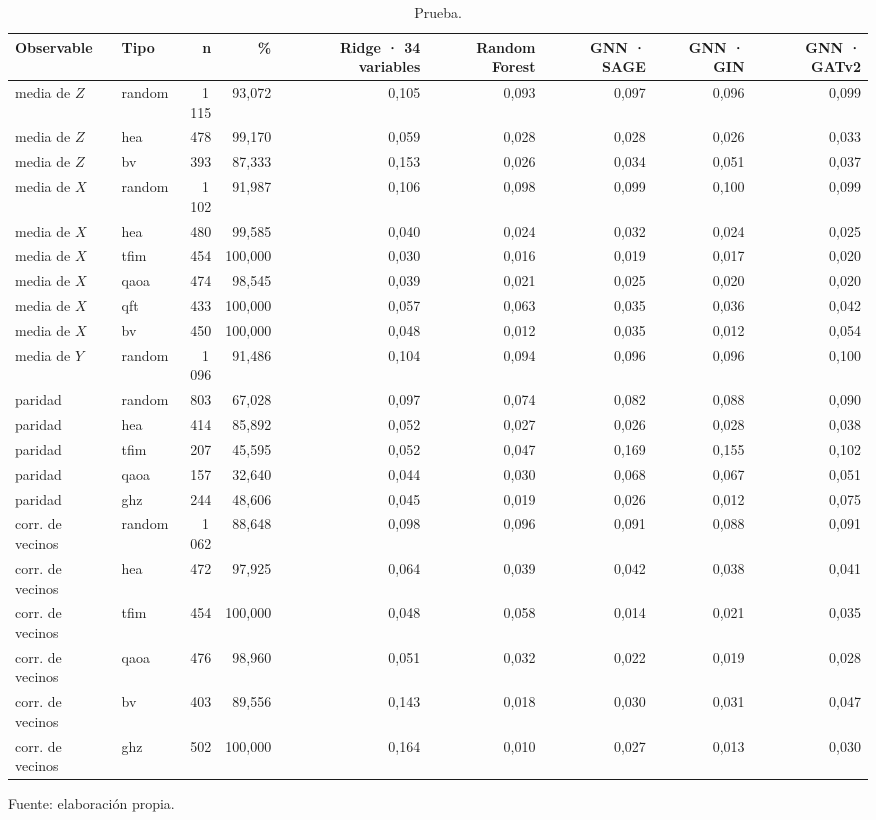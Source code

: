 \begin{table}[htbp]
    \centering
    {\footnotesize
    \begin{tabular}{@{}llrrrrrrr@{}}
        \toprule
        \textbf{Observable} & \textbf{Tipo} & \textbf{n} & \textbf{\%} & \textbf{Ridge · 34 variables} & \textbf{Random Forest} & \textbf{GNN · SAGE} & \textbf{GNN · GIN} & \textbf{GNN · GATv2} \\
        \midrule
        media de $Z$ & random & 1\,115 & 93,072 & 0,105 & 0,093 & 0,097 & 0,096 & 0,099 \\
        media de $Z$ & hea & 478 & 99,170 & 0,059 & 0,028 & 0,028 & 0,026 & 0,033 \\
        media de $Z$ & bv & 393 & 87,333 & 0,153 & 0,026 & 0,034 & 0,051 & 0,037 \\
        media de $X$ & random & 1\,102 & 91,987 & 0,106 & 0,098 & 0,099 & 0,100 & 0,099 \\
        media de $X$ & hea & 480 & 99,585 & 0,040 & 0,024 & 0,032 & 0,024 & 0,025 \\
        media de $X$ & tfim & 454 & 100,000 & 0,030 & 0,016 & 0,019 & 0,017 & 0,020 \\
        media de $X$ & qaoa & 474 & 98,545 & 0,039 & 0,021 & 0,025 & 0,020 & 0,020 \\
        media de $X$ & qft & 433 & 100,000 & 0,057 & 0,063 & 0,035 & 0,036 & 0,042 \\
        media de $X$ & bv & 450 & 100,000 & 0,048 & 0,012 & 0,035 & 0,012 & 0,054 \\
        media de $Y$ & random & 1\,096 & 91,486 & 0,104 & 0,094 & 0,096 & 0,096 & 0,100 \\
        paridad & random & 803 & 67,028 & 0,097 & 0,074 & 0,082 & 0,088 & 0,090 \\
        paridad & hea & 414 & 85,892 & 0,052 & 0,027 & 0,026 & 0,028 & 0,038 \\
        paridad & tfim & 207 & 45,595 & 0,052 & 0,047 & 0,169 & 0,155 & 0,102 \\
        paridad & qaoa & 157 & 32,640 & 0,044 & 0,030 & 0,068 & 0,067 & 0,051 \\
        paridad & ghz & 244 & 48,606 & 0,045 & 0,019 & 0,026 & 0,012 & 0,075 \\
        corr. de vecinos & random & 1\,062 & 88,648 & 0,098 & 0,096 & 0,091 & 0,088 & 0,091 \\
        corr. de vecinos & hea & 472 & 97,925 & 0,064 & 0,039 & 0,042 & 0,038 & 0,041 \\
        corr. de vecinos & tfim & 454 & 100,000 & 0,048 & 0,058 & 0,014 & 0,021 & 0,035 \\
        corr. de vecinos & qaoa & 476 & 98,960 & 0,051 & 0,032 & 0,022 & 0,019 & 0,028 \\
        corr. de vecinos & bv & 403 & 89,556 & 0,143 & 0,018 & 0,030 & 0,031 & 0,047 \\
        corr. de vecinos & ghz & 502 & 100,000 & 0,164 & 0,010 & 0,027 & 0,013 & 0,030 \\
        \bottomrule
    \end{tabular}}

    \caption{Prueba.}
    \label{tab:e_tipo_mae_f}

    {\footnotesize Fuente: elaboración propia.}
\end{table}
